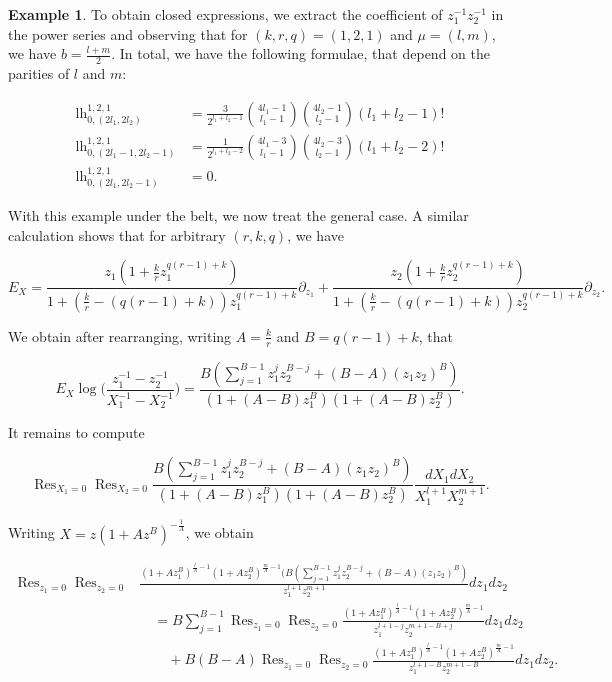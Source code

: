 \documentclass[10pt,a4paper,oneside,no-math,reqno]{amsart}%
\theoremstyle{plain}
\theoremstyle{definition}
\newtheorem{example}[theorem]{Example}
\theoremstyle{remark}
\numberwithin{equation}{section}
\newcommand{\1}{\mathds{1}}
\newcommand{\<}{\langle}
\renewcommand{\>}{\rangle}
\DeclareMathOperator*{\Res}{Res}
\newcommand{\lh}{\mathord{\mathrm{l\!h}}}
\begin{document}
\begin{example}
To obtain closed expressions, we extract the coefficient of $z_1^{-1} z_2^{-1}$ in the power series and observing that for $(k,r,q)=(1,2,1)$ and $\mu=(l,m)$, we have $b=\frac{l+m}{2}$. In total, we have the following formulae, that depend on the parities of $l$ and $m$:

\begin{align}
		\lh^{1,2,1}_{0,(2l_1,2l_2)}
		&=
		\frac{3}{2^{l_1+l_2-1}} \binom{4l_1-1}{l_1-1} \binom{4l_2-1}{l_2-1} (l_1 + l_2 - 1)! \label{h02EvenSimplecase}
		\\
		\lh^{1,2,1}_{0,(2l_1-1,2l_2-1)}
		&=
		\frac{1}{2^{l_1+l_2-2}} \binom{4l_1 -3}{l_1 -1} \binom{4l_2 -3}{l_2 -1} (l_1 + l_2 -2)!
		\\
		\lh^{1,2,1}_{0,(2l_1,2l_2-1)}
		&=
		0 .
	\end{align}
\end{example}


With this example under the belt, we now treat the general case. A similar calculation shows that for arbitrary $(r,k,q)$, we have

\begin{equation}
    E_X
    =
    \frac{z_1 (1 + \frac{k}{r} z_1^{q(r-1)+k})}{1 + (\frac{k}{r} - (q(r-1)+k)) z_1^{q(r-1)+k}} \partial_{z_1} + \frac{z_2 (1 + \frac{k}{r} z_2^{q(r-1)+k})}{1 + (\frac{k}{r} - (q(r-1)+k)) z_2^{q(r-1)+k}} \partial_{z_2}.
\end{equation}

We obtain after rearranging, writing $A=\frac{k}{r}$ and $B=q(r-1)+k$, that

\begin{equation}
    E_X \log \big( \frac{z_1^{-1} - z_2^{-1}}{X_1^{-1} - X_2^{-1}} \big)
    =
    \frac{B( \sum_{j=1}^{B-1} z_1^j z_2^{B-j} + (B-A) (z_1z_2)^B)}{(1 + (A - B) z_1^{B}) (1 + (A - B) z_2^{B})}.
\end{equation}

It remains to compute

\begin{equation}
    \Res_{X_1=0} \Res_{X_2=0}  \frac{B (\sum_{j=1}^{B-1} z_1^j z_2^{B-j} + (B - A) (z_1 z_2)^B)}{(1 + (A - B) z_1^{B}) (1 + (A - B) z_2^{B})} \frac{ dX_1 dX_2 }{X_1^{l+1} X_2^{m+1}}.
\end{equation}

Writing $X=z(1+Az^B)^{-\frac{1}{A}}$, we obtain

\begin{equation}
\begin{split}               
    \Res_{z_1=0} \Res_{z_2=0} & \frac{(1 + A z_1^B)^{\frac{l}{A} - 1}(1 + A z_2^B)^{\frac{m}{A} - 1} (B (\sum_{j=1}^{B-1} z_1^j z_2^{B-j} + (B - A) (z_1 z_2)^B)}{z_1^{l+1} z_2^{m+1}} dz_1 dz_2
    \\
    & \quad=
    B\sum_{j=1}^{B-1} \Res_{z_1=0} \Res_{z_2=0} \frac{(1 + A z_1^B)^{\frac{l}{A} - 1}(1 + A z_2^B)^{\frac{m}{A} - 1}}{z_1^{l+1-j} z_2^{m+1-B+j}} dz_1 dz_2
    \\
    & \qquad
    +B (B - A) \Res_{z_1=0} \Res_{z_2=0} \frac{(1 + A z_1^B)^{\frac{l}{A} - 1}(1 + A z_2^B)^{\frac{m}{A} - 1}}{z_1^{l+1-B} z_2^{m+1-B}} dz_1 dz_2.
\end{split}
\end{equation}
\end{document}
